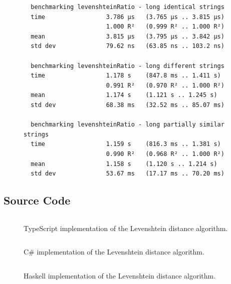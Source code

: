 \begin{landscape}
\begin{figure}[H]
\begin{verbatim}
  benchmarking levenshteinRatio - long identical strings
  time                 3.786 μs   (3.765 μs .. 3.815 μs)
                       1.000 R²   (0.999 R² .. 1.000 R²)
  mean                 3.815 μs   (3.795 μs .. 3.842 μs)
  std dev              79.62 ns   (63.85 ns .. 103.2 ns)

  benchmarking levenshteinRatio - long different strings
  time                 1.178 s    (847.8 ms .. 1.411 s)
                       0.991 R²   (0.970 R² .. 1.000 R²)
  mean                 1.174 s    (1.121 s .. 1.245 s)
  std dev              68.38 ms   (32.52 ms .. 85.07 ms)

  benchmarking levenshteinRatio - long partially similar strings
  time                 1.159 s    (816.3 ms .. 1.381 s)
                       0.990 R²   (0.968 R² .. 1.000 R²)
  mean                 1.158 s    (1.120 s .. 1.214 s)
  std dev              53.67 ms   (17.17 ms .. 70.20 ms)
  \end{verbatim}
\end{figure}
\hfill

\subsection*{Source Code}
\begin{figure}[H]
  \caption{TypeScript implementation of the Levenshtein distance algorithm.}
  \label{code:typescript}
  \inputminted[fontsize=\footnotesize]{typescript}{./doc/levenshteinRatio.ts}
\end{figure}

\hfill

\begin{figure}[H]
  \caption{C\# implementation of the Levenshtein distance algorithm.}
  \label{code:csharp}
  \inputminted[fontsize=\footnotesize]{csharp}{./doc/LevenshteinRatio.cs}
\end{figure}

\hfill

\begin{figure}[H]
  \caption{Haskell implementation of the Levenshtein distance algorithm.}
  \label{code:haskell}
  \inputminted[fontsize=\footnotesize]{haskell}{./doc/LevenshteinRatio.hs}
\end{figure}

\end{landscape}
